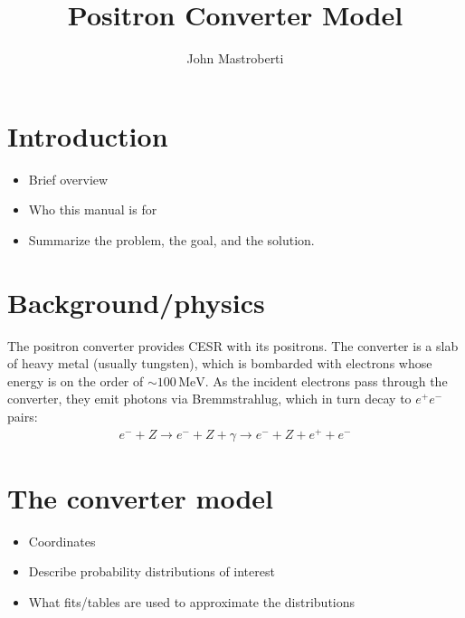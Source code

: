\documentclass[12pt]{article}
\newcommand{\MeV}{\, \mathrm{MeV}}
\begin{document}
\title{Positron Converter Model}
\author{John Mastroberti}

\maketitle

\newcommand{\dxds}{\frac{dx}{ds}}
\newcommand{\dyds}{\frac{dy}{ds}}
\newcommand{\exes}{\texttt{converter\_simulation}}
\newcommand{\exef}{\texttt{converter\_fitter}}
\newcommand{\configfile}{\texttt{config.txt}}
\newcommand{\bmad}{\textit{Bmad}}

\tableofcontents

\newpage

\section{Introduction}
\begin{itemize}
\item
Brief overview

\item
Who this manual is for

\item
Summarize the problem, the goal, and the solution.

\end{itemize}


\section{Background/physics}
The positron converter provides CESR with its positrons.
The converter is a slab of heavy metal (usually tungsten), which is bombarded with electrons whose energy is on the order of $\sim 100 \MeV$.
As the incident electrons pass through the converter, they emit photons via Bremmstrahlug, which in turn decay to $e^+ e^-$ pairs:
\begin{align}
e^- + Z \rightarrow e^- + Z + \gamma \rightarrow e^- + Z + e^+ + e^-
\end{align}


\section{The converter model}
\begin{itemize}
\item
Coordinates

\item
Describe probability distributions of interest

\item
What fits/tables are used to approximate the distributions

\end{itemize}
\end{document}
